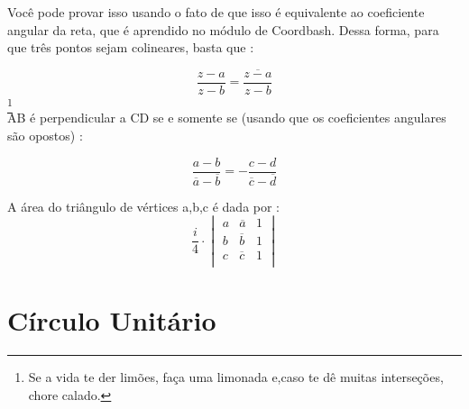 \documentclass{article}
\begin{document}
Você pode provar isso usando o fato de que isso é equivalente ao coeficiente angular da reta, que é aprendido no módulo de Coordbash. Dessa forma, para que três pontos sejam colineares, basta que : 

$$\frac{z-a}{z-b} = \overline{\frac{z-a}{z-b}}$$
\footnote{Se a vida te der limões, faça uma limonada e,caso te dê muitas interseções, chore calado.}
\\
AB é perpendicular a CD se e somente se (usando que os coeficientes angulares são opostos) :

$$\frac{a-b}{\overline{a} - \overline{b}} = - \frac{c-d}{\overline{c} - \overline{d}}$$

\begin{tcolorbox}[colback=blue!5!white,colframe=blue!75!black,title=Área complexa\emoji{nerd-face}]
A área do triângulo de vértices a,b,c é dada por : 
$$
\frac{i}{4} \cdot 
\begin{vmatrix}
a & \overline{a} & 1 \\
b & \overline{b} & 1 \\
c & \overline{c} & 1 \\
\end{vmatrix}
$$
\end{tcolorbox}

\section{Círculo Unitário}
\end{document}
